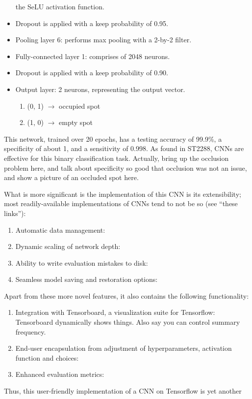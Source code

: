 \documentclass[a4paper, 11pt]{article} %
\begin{document}
\begin{itemize}
		the SeLU activation function.
		\item[] Dropout is applied with a keep probability of 0.95.
		\item[] Pooling layer 6: performs max pooling with a 2-by-2 filter.
		\item[] Fully-connected layer 1: comprises of 2048 neurons.
		\item[] Dropout is applied with a keep probability of 0.90.
		\item[] Output layer: 2 neurons, representing the output vector.
		\vspace*{-4mm}
		\begin{enumerate}
			\setlength\itemsep{-3mm}
			\item[] (0, 1) $\rightarrow$ occupied spot
			\item[] (1, 0) $\rightarrow$ empty spot
		\end{enumerate}
	\end{itemize}
	This network, trained over 20 epochs, has a testing accuracy of 99.9\%, a specificity of about 1, and a
	sensitivity of 0.998. As found in ST2288, CNNs are effective for this 
	binary classification task.
	Actually, bring up the occlusion problem here, and talk about specificity 
	so good that occlusion was not an issue, and show a picture of an occluded 
	spot here.

	What is more significant is the implementation of this CNN is its 
	extensibility; most readily-available implementations of CNNs tend to not 
	be so (see ``these links''):
	\begin{enumerate}
		\item Automatic data management:
		\item Dynamic scaling of network depth:
		\item Ability to write evaluation mistakes to disk:
		\item Seamless model saving and restoration options:
	\end{enumerate}
	Apart from these more novel features, it also contains the following 
	functionality:
	\begin{enumerate}
		\item Integration with Tensorboard, a visualization suite for 
		Tensorflow: Tensorboard dynamically shows things. Also say you can 
		control summary frequency.
		\item End-user encapsulation from adjustment of hyperparameters, 
		activation function and choices:
		\item Enhanced evaluation metrics:
	\end{enumerate}
	Thus, this user-friendly implementation of a CNN on Tensorflow is yet 
	another 
\end{document}
